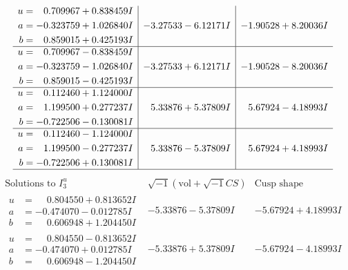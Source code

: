 \documentclass[1p]{elsarticle_modified}
\theoremstyle{definition}
\newcommand{\I}{\sqrt{-1}}
\begin{document}
$$\begin{array}{c|c|c}
\begin{aligned}
u &= \phantom{-}0.709967 + 0.838459 I \\
a &= -0.323759 + 1.026840 I \\
b &= \phantom{-}0.859015 + 0.425193 I\end{aligned}
 & -3.27533 - 6.12171 I & -1.90528 + 8.20036 I \\ \hline\begin{aligned}
u &= \phantom{-}0.709967 - 0.838459 I \\
a &= -0.323759 - 1.026840 I \\
b &= \phantom{-}0.859015 - 0.425193 I\end{aligned}
 & -3.27533 + 6.12171 I & -1.90528 - 8.20036 I \\ \hline\begin{aligned}
u &= \phantom{-}0.112460 + 1.124000 I \\
a &= \phantom{-}1.199500 + 0.277237 I \\
b &= -0.722506 - 0.130081 I\end{aligned}
 & \phantom{-}5.33876 + 5.37809 I & \phantom{-}5.67924 - 4.18993 I \\ \hline\begin{aligned}
u &= \phantom{-}0.112460 - 1.124000 I \\
a &= \phantom{-}1.199500 - 0.277237 I \\
b &= -0.722506 + 0.130081 I\end{aligned}
 & \phantom{-}5.33876 - 5.37809 I & \phantom{-}5.67924 + 4.18993 I\\
 \hline 
 \end{array}$$\newpage$$\begin{array}{c|c|c}  
\text{Solutions to }I^u_{3}& \I (\text{vol} + \sqrt{-1}CS) & \text{Cusp shape}\\
 \hline 
\begin{aligned}
u &= \phantom{-}0.804550 + 0.813652 I \\
a &= -0.474070 - 0.012785 I \\
b &= \phantom{-}0.606948 + 1.204450 I\end{aligned}
 & -5.33876 - 5.37809 I & -5.67924 + 4.18993 I \\ \hline\begin{aligned}
u &= \phantom{-}0.804550 - 0.813652 I \\
a &= -0.474070 + 0.012785 I \\
b &= \phantom{-}0.606948 - 1.204450 I\end{aligned}
 & -5.33876 + 5.37809 I & -5.67924 - 4.18993 I \\ \hline\begin{aligned}

\end{aligned}
\end{array}$$
\end{document}
